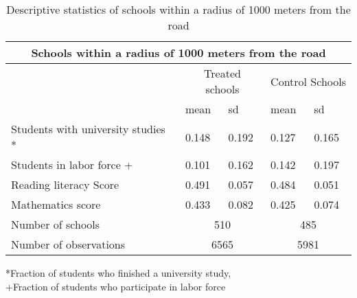 \documentclass[9pt]{beamer}
\begin{document}
\begin{frame}{}
\hyperlink{data}{}
\begin{center}
    
\begin{table}[h!]
\caption{Descriptive statistics of schools within a radius of 1000 meters from the road}
\label{tab:my-table}
\begin{tabular}{lllll}
\hline
\multicolumn{5}{c}{Schools within a radius of 1000 meters from the road}                                           \\ \hline
\multicolumn{1}{c}{\multirow{}{}{}}  & \multicolumn{2}{c}{Treated schools} & \multicolumn{2}{c}{Control Schools} \\ \cline{2-5} 
\multicolumn{1}{c}{}                   & mean             & sd               & mean             & sd               \\ \hline
Students with  university studies *    & 0.148            & 0.192            & 0.127            & 0.165            \\
Students  in   labor force +           & 0.101            & 0.162            & 0.142            & 0.197            \\
Reading literacy Score                 & 0.491            & 0.057            & 0.484            & 0.051            \\
Mathematics score                      & 0.433            & 0.082            & 0.425            & 0.074            \\ \hline
Number of schools                      & \multicolumn{2}{c}{510}             & \multicolumn{2}{c}{485}             \\
Number of observations                 & \multicolumn{2}{c}{6565}            & \multicolumn{2}{c}{5981}            \\ \hline
\end{tabular}

\end{table}
     \begin{tablenotes}
      \small
      *Fraction of students who finished a   university study, \\
       +Fraction of students who participate in   labor force 
    \end{tablenotes}
    
 \end{center}  
 
 \end{frame}
\end{document}
